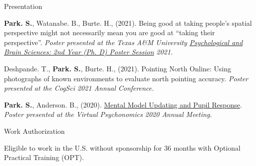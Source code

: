 \documentclass{resume} %
\begin{document}
\begin{rSection}{Presentation}
\begin{hangingpar}
	\end{hangingpar}

    \begin{hangingpar}
        
        \textbf{Park. S.}, Watanabe. B., Burte. H., (2021). 
        Being good at taking people's spatial perspective might not necessarily 
        mean you are good at “taking their perspective”. 
        \em{Poster presented at the Texas A\&M University
            \href{https://sites.google.com/tamu.edu/2021-2nd-year-poster/home}{Psychological
             and Brain Sciences: 2nd Year (Ph. D) Poster Session} 2021.}
        
    \end{hangingpar}
	
	\begin{hangingpar}
		
		 Deshpande. T., \textbf{Park. S.}, Burte. H., (2021). 
		 Pointing North Online: Using photographs of known environments to 
		 evaluate north pointing accuracy. 
		 \em{Poster presented at the CogSci 2021 Annual Conference.}
		
	\end{hangingpar}

	\begin{hangingpar}
		
		\textbf{Park. S.}, Anderson. B., (2020). \href{https://brittlab.uwaterloo.ca/2021/01/07/sungjoon-presents-psychonomics/}
		{Mental Model Updating and Pupil Response}. 
		\em{Poster presented at the Virtual Psychonomics 2020 Annual Meeting.}
		
	\end{hangingpar}
	
\end{rSection}


\begin{rSection}{Work Authorization}
    
    Eligible to work in the U.S. without sponsorship for 36 months with 
    Optional Practical Training (OPT).
    
\end{rSection}
\end{document}

